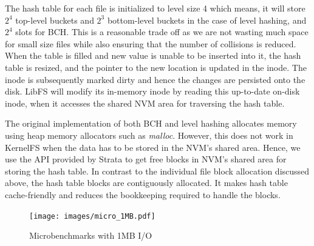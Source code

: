 \documentclass[letterpaper,twocolumn, 11pt]{article}
\begin{document}
The hash table for each file is initialized to level size 4 which means, it will store $2^4$ top-level buckets and $2^3$ bottom-level buckets in the case of level hashing, and $2^4$ slots for BCH. This is a reasonable trade off as we are not wasting much space for small size files while also ensuring that the number of collisions is reduced. When the table is filled and new value is unable to be inserted into it, the hash table is resized, and the pointer to the new location is updated in the inode. The inode is subsequently marked dirty and hence the changes are persisted onto the disk. LibFS will modify its in-memory inode by reading this up-to-date on-disk inode, when it accesses the shared NVM area for traversing the hash table.

The original implementation of both BCH and level hashing allocates memory using heap memory allocators such as \textit{malloc}. However, this does not work in KernelFS when the data has to be stored in the NVM's shared area. Hence, we use the API provided by Strata to get free blocks in NVM's shared area for storing the hash table. In contrast to the individual file block allocation discussed above, the hash table blocks are contiguously allocated. It makes hash table cache-friendly and reduces the bookkeeping required to handle the blocks.
\begin{figure}[t]
\centering
\texttt{[image: images/micro\_1MB.pdf]}
\caption{Microbenchmarks with 1MB I/O}
\label{fig:micro_1mb}
\end{figure}
\end{document}
